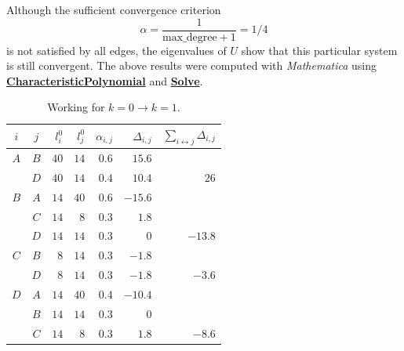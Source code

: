 \documentclass{article}
\newcommand\mma[1]%
    {\href{https://reference.wolfram.com/language/ref/#1.html}{\textbf{#1}}}
\numberwithin{equation}{section}
\numberwithin{table}{section}
\numberwithin{figure}{section}
\begin{document}
\begin{enumerate}
\begin{enumerate}
            Although the sufficient convergence criterion
            \begin{equation}
                \alpha = \frac{1}{\text{max\_degree} + 1} = 1/4
            \end{equation}
            is not satisfied by all edges, the eigenvalues of $U$ show that this
           particular system is still convergent. The above results were
           computed with \emph{Mathematica} using \mma{CharacteristicPolynomial}
           and \mma{Solve}.
    \end{enumerate}
\end{enumerate}

\begin{table}[p]
    \centering%
    \begin{subtable}{\linewidth}
    \centering%
    \begin{tabular}{cc|rrrrr}
        $i$ & $j$ & $l_i^0$ & $l_j^0$ & $\alpha_{i,j}$ &
            $\Delta_{i,j}$ & $\sum_{i\leftrightarrow j} \Delta_{i,j}$ \\
        \toprule
        $A$&$B$&$40$&$14$&$0.6$&$15.6$& \\
        &$D$&$40$&$14$&$0.4$&$10.4$&$26$\\
        \midrule
        $B$&$A$&$14$&$40$&$0.6$&$-15.6$& \\
        &$C$&$14$&$8$&$0.3$&$1.8$& \\
        &$D$&$14$&$14$&$0.3$&$0$&$-13.8$\\
        \midrule
        $C$&$B$&$8$&$14$&$0.3$&$-1.8$& \\
        &$D$&$8$&$14$&$0.3$&$-1.8$&$-3.6$\\
        \midrule
        $D$&$A$&$14$&$40$&$0.4$&$-10.4$& \\
        &$B$&$14$&$14$&$0.3$&$0$& \\
        &$C$&$14$&$8$&$0.3$&$1.8$&$-8.6$ \\
        \bottomrule
    \end{tabular}
    \caption{Working for $k=0 \to k=1$.}%
    \label{table:diffusion-working-1}
    \end{subtable}


\end{table}
\end{document}
